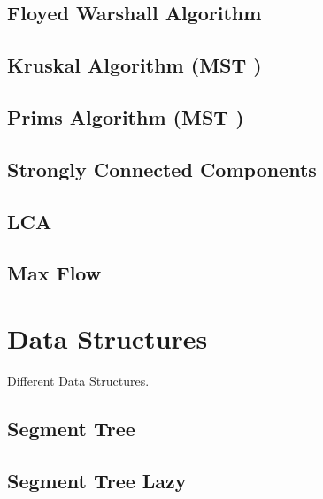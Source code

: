 \documentclass[10pt, a4paper]{article}
\begin{document}
\begin{multicols}{2}
\subsection{Floyed Warshall Algorithm}


\subsection{Kruskal Algorithm (MST \allowbreak)}


\subsection{Prims Algorithm (MST \allowbreak)}


\subsection{Strongly Connected Components}


\subsection{LCA}


\subsection{Max Flow}


\section{Data Structures}
Different Data Structures.

\subsection{Segment Tree}


\subsection{Segment Tree Lazy}



\end{multicols}
\end{document}
